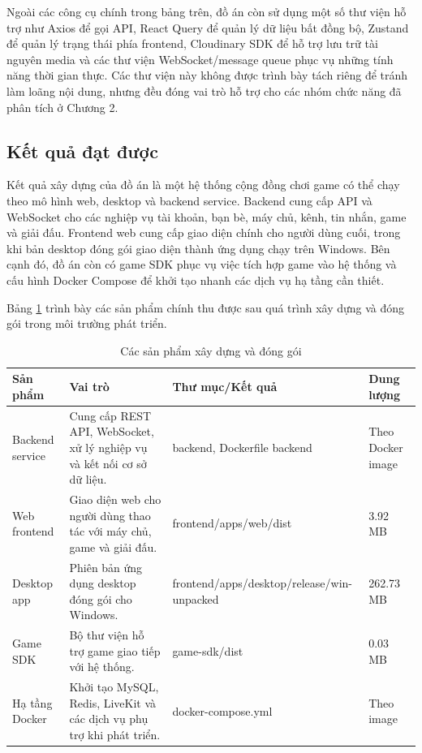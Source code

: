 Ngoài các công cụ chính trong bảng trên, đồ án còn sử dụng một số thư viện hỗ trợ như Axios để gọi API, React Query để quản lý dữ liệu bất đồng bộ, Zustand để quản lý trạng thái phía frontend, Cloudinary SDK để hỗ trợ lưu trữ tài nguyên media và các thư viện WebSocket/message queue phục vụ những tính năng thời gian thực. Các thư viện này không được trình bày tách riêng để tránh làm loãng nội dung, nhưng đều đóng vai trò hỗ trợ cho các nhóm chức năng đã phân tích ở Chương 2.

\subsection{Kết quả đạt được}
\label{subsection:4.3.2}

Kết quả xây dựng của đồ án là một hệ thống cộng đồng chơi game có thể chạy theo mô hình web, desktop và backend service. Backend cung cấp API và WebSocket cho các nghiệp vụ tài khoản, bạn bè, máy chủ, kênh, tin nhắn, game và giải đấu. Frontend web cung cấp giao diện chính cho người dùng cuối, trong khi bản desktop đóng gói giao diện thành ứng dụng chạy trên Windows. Bên cạnh đó, đồ án còn có game SDK phục vụ việc tích hợp game vào hệ thống và cấu hình Docker Compose để khởi tạo nhanh các dịch vụ hạ tầng cần thiết.

Bảng \ref{tab:4-7-san-pham-dong-goi} trình bày các sản phẩm chính thu được sau quá trình xây dựng và đóng gói trong môi trường phát triển.

\begin{table}[H]
    \centering
    \caption{Các sản phẩm xây dựng và đóng gói}
    \label{tab:4-7-san-pham-dong-goi}
    \small
    \begin{tabular}{|p{}|p{}|p{}|p{}|}
        \hline
        \textbf{Sản phẩm} & \textbf{Vai trò} & \textbf{Thư mục/Kết quả} & \textbf{Dung lượng} \\ \hline
        Backend service & Cung cấp REST API, WebSocket, xử lý nghiệp vụ và kết nối cơ sở dữ liệu. & backend, Dockerfile backend & Theo Docker image \\ \hline
        Web frontend & Giao diện web cho người dùng thao tác với máy chủ, game và giải đấu. & frontend/apps/web/dist & 3.92 MB \\ \hline
        Desktop app & Phiên bản ứng dụng desktop đóng gói cho Windows. & frontend/apps/desktop/release/win-unpacked & 262.73 MB \\ \hline
        Game SDK & Bộ thư viện hỗ trợ game giao tiếp với hệ thống. & game-sdk/dist & 0.03 MB \\ \hline
        Hạ tầng Docker & Khởi tạo MySQL, Redis, LiveKit và các dịch vụ phụ trợ khi phát triển. & docker-compose.yml & Theo image \\ \hline
    \end{tabular}
\end{table}

